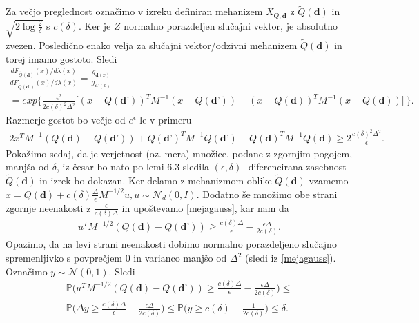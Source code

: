 \documentclass[12pt,a4paper]{amsart}
\theoremstyle{definition} %
\theoremstyle{plain} %
\begin{document}
Za večjo preglednost označimo v izreku definiran mehanizem $X_{Q, \textbf{d}}$ z $\tilde{Q}(\textbf{d})$ in  $\sqrt{2\log{\frac{2}{\delta}}}$ s $c(\delta)$. Ker je $Z$ normalno porazdeljen slučajni vektor, je absolutno zvezen. Posledično enako velja za slučajni vektor/odzivni mehanizem $\tilde{Q}(\textbf{d})$ in torej imamo gostoto. Sledi
\begin{gather*}
\frac{dF_{\tilde{Q}(\textbf{d})}(x)/d \lambda (x)}{dF_{\tilde{Q}(\textbf{d'})}(x)/d \lambda (x)} = \frac{g_{\textbf{d} (x)}}{g_{\textbf{d'} (x)}} \\ 
=  exp \bigg\{ \frac{\epsilon^2}{2c(\delta)^2 \Delta^2} \Big[ (x-Q(\textbf{d'}))^T M^{-1} (x-Q(\textbf{d'})) - (x-Q(\textbf{d}))^T M^{-1} (x-Q(\textbf{d}))\Big]\ \bigg\}.
\end{gather*}
Razmerje gostot bo večje od $e^{\epsilon}$ le v primeru
\begin{gather*}
2x^T M^{-1}(Q(\textbf{d})-Q(\textbf{d'})) + Q(\textbf{d'})^T M^{-1} Q(\textbf{d'}) - Q(\textbf{d})^T M^{-1} Q(\textbf{d}) \geq 2 \frac{c(\delta)^2 \Delta^2}{\epsilon}.
\end{gather*}
Pokažimo sedaj, da je verjetnost (oz. mera) množice, podane z zgornjim pogojem, manjša od $\delta$, iz česar bo nato po lemi 6.3 sledila $(\epsilon, \delta)$ -diferencirana zasebnost $\tilde{Q}(\textbf{d})$ in izrek bo dokazan.
\newline
\newline
Ker delamo z mehanizmom oblike $\tilde{Q}(\textbf{d})$ vzamemo $x = Q(\textbf{d}) + c(\delta) \frac{\Delta}{\epsilon} M^{-1/2}u, u \sim \mathcal{N}_d (0,I)$. Dodatno še množimo obe strani zgornje neenakosti z $\frac{\epsilon}{c(\delta)\Delta}$ in upoštevamo \eqref{mejagauss}, kar nam da
\begin{gather*}
u^T M^{-1/2}(Q(\textbf{d})-Q(\textbf{d'})) \geq \frac{c(\delta)\Delta}{\epsilon} - \frac{\epsilon \Delta}{2 c(\delta)}.
\end{gather*}
Opazimo, da na levi strani neenakosti dobimo normalno porazdeljeno slučajno spremenljivko s povprečjem 0 in varianco manjšo od $\Delta^2$ (sledi iz \eqref{mejagauss}). Označimo $y \sim \mathcal{N}(0,1)$. Sledi 
\begin{gather*}
\mathbb{P}\Big(u^T M^{-1/2}(Q(\textbf{d})-Q(\textbf{d'})) \geq \frac{c(\delta)\Delta}{\epsilon} - \frac{\epsilon \Delta}{2 c(\delta)}\Big) \leq \\
\mathbb{P}\Big(\Delta y \geq \frac{c(\delta)\Delta}{\epsilon} - \frac{\epsilon \Delta}{2 c(\delta)}\Big) \leq \mathbb{P}\Big(y \geq c(\delta) - \frac{1}{2 c(\delta)}\Big) \leq \delta.
\end{gather*}
\end{document}
